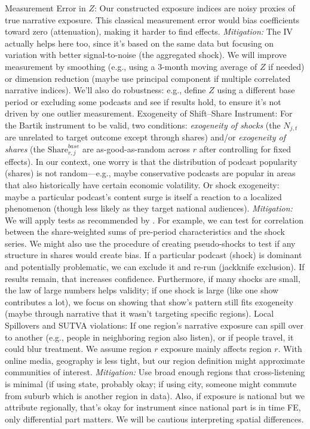 \documentclass[12pt]{article}
\begin{document}
Measurement Error in $Z$: Our constructed exposure indices are noisy proxies of true narrative exposure. This classical measurement error would bias coefficients toward zero (attenuation), making it harder to find effects. \textit{Mitigation:} The IV actually helps here too, since it's based on the same data but focusing on variation with better signal-to-noise (the aggregated shock). We will improve measurement by smoothing (e.g., using a 3-month moving average of $Z$ if needed) or dimension reduction (maybe use principal component if multiple correlated narrative indices). We'll also do robustness: e.g., define $Z$ using a different base period or excluding some podcasts and see if results hold, to ensure it's not driven by one outlier measurement.
Exogeneity of Shift–Share Instrument: For the Bartik instrument to be valid, two conditions: \textit{exogeneity of shocks} (the $N_{j,t}$ are unrelated to target outcome except through shares) and/or \textit{exogeneity of shares} (the $\text{Share}_{r,j}^{base}$ are as-good-as-random across $r$ after controlling for fixed effects). In our context, one worry is that the distribution of podcast popularity (shares) is not random—e.g., maybe conservative podcasts are popular in areas that also historically have certain economic volatility. Or shock exogeneity: maybe a particular podcast's content surge is itself a reaction to a localized phenomenon (though less likely as they target national audiences). \textit{Mitigation:} We will apply tests as recommended by \citet{Borusyak2022shiftshare}. For example, we can test for correlation between the share-weighted sums of pre-period characteristics and the shock series. We might also use the procedure of creating pseudo-shocks to test if any structure in shares would create bias. If a particular podcast (shock) is dominant and potentially problematic, we can exclude it and re-run (jackknife exclusion). If results remain, that increases confidence. Furthermore, if many shocks are small, the law of large numbers helps validity\citep{borusyakhull2025}; if one shock is large (like one show contributes a lot), we focus on showing that show's pattern still fits exogeneity (maybe through narrative that it wasn't targeting specific regions).
Local Spillovers and SUTVA violations: If one region's narrative exposure can spill over to another (e.g., people in neighboring region also listen), or if people travel, it could blur treatment. We assume region $r$ exposure mainly affects region $r$. With online media, geography is less tight, but our region definition might approximate communities of interest. \textit{Mitigation:} Use broad enough regions that cross-listening is minimal (if using state, probably okay; if using city, someone might commute from suburb which is another region in data). Also, if exposure is national but we attribute regionally, that's okay for instrument since national part is in time FE, only differential part matters. We will be cautious interpreting spatial differences.
\end{document}

